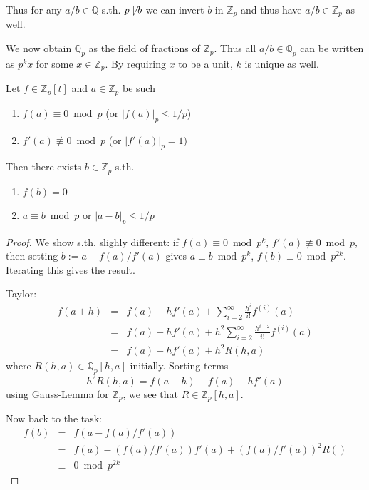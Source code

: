Thus for any $a/b\in\mathbb Q$ s.th. $p\not\mid b$ we can invert $b$ in $\mathbb Z_p$ and thus have $a/b\in\mathbb Z_p$ as well.

We now obtain $\mathbb Q_p$ as the field of fractions of $\mathbb Z_p$.
Thus all $a/b\in\mathbb Q_p$ can be written as $p^k x$ for some $x\in \mathbb Z_p$. By requiring $x$ to be a unit, $k$ is unique as well.

\begin{lemma}
  Let $f\in \mathbb Z_p[t]$ and $a\in \mathbb Z_p$ be such
  \begin{enumerate}
    \item $f(a) \equiv 0\bmod p$ (or $|f(a)|_p\le 1/p$)
    \item $f'(a) \not\equiv 0\bmod p$ (or $|f'(a)|_p = 1)$
  \end{enumerate}
  Then there exists $b\in\mathbb Z_p$ s.th.
  \begin{enumerate}
    \item $f(b) = 0$
    \item $a\equiv b\bmod p$ or $|a-b|_p\le 1/p$
  \end{enumerate}
\end{lemma}
\begin{proof}
  We show s.th. slighly different:
  if $f(a) \equiv 0 \bmod p^k$, $f'(a) \not\equiv 0\bmod p$, then setting
  $b := a-f(a)/f'(a)$ gives
  $a\equiv b\bmod p^k$, $f(b) \equiv 0 \bmod p^{2k}$.
  Iterating this gives the result.

  Taylor:
  \begin{eqnarray*}
    f(a+h) &=& f(a) + hf'(a) + \sum_{i=2}^\infty\frac{h^i}{i!}f^{(i)}(a) \\
           &=& f(a) + hf'(a) + h^2\sum_{i=2}^\infty\frac{h^{i-2}}{i!}f^{(i)}(a)\\
           &=& f(a) + hf'(a) + h^2 R(h, a)
  \end{eqnarray*}
  where $R(h, a) \in \mathbb Q_p[h, a]$ initially. Sorting terms
  $$h^2 R(h, a) = f(a+h) - f(a) -hf'(a)$$
  using Gauss-Lemma for $\mathbb Z_p$, we see that $R\in\mathbb Z_p[h,a]$.

  Now back to the task:
  \begin{eqnarray*}
    f(b) &=& f(a-f(a)/f'(a))\\
         &=& f(a) -(f(a)/f'(a)) f'(a) + (f(a)/f'(a))^2R()\\
         &\equiv& 0 \bmod p^{2k}
  \end{eqnarray*}

\end{proof}

